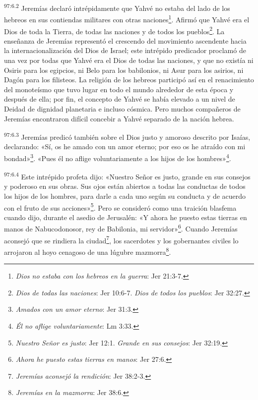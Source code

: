 \par
\textsuperscript{97:6.2} Jeremías declaró intrépidamente que Yahvé no estaba del lado de los hebreos en sus contiendas militares con otras naciones\footnote{\textit{Dios no estaba con los hebreos en la guerra}: Jer 21:3-7.}. Afirmó que Yahvé era el Dios de toda la Tierra, de todas las naciones y de todos los pueblos\footnote{\textit{Dios de todas las naciones}: Jer 10:6-7. \textit{Dios de todos los pueblos}: Jer 32:27.}. La enseñanza de Jeremías representó el crescendo del movimiento ascendente hacia la internacionalización del Dios de Israel; este intrépido predicador proclamó de una vez por todas que Yahvé era el Dios de todas las naciones, y que no existía ni Osiris para los egipcios, ni Belo para los babilonios, ni Asur para los asirios, ni Dagón para los filisteos. La religión de los hebreos participó así en el renacimiento del monoteísmo que tuvo lugar en todo el mundo alrededor de esta época y después de ella; por fin, el concepto de Yahvé se había elevado a un nivel de Deidad de dignidad planetaria e incluso cósmica. Pero muchos compañeros de Jeremías encontraron difícil concebir a Yahvé separado de la nación hebrea.

\par
\textsuperscript{97:6.3} Jeremías predicó también sobre el Dios justo y amoroso descrito por Isaías, declarando: «Sí, os he amado con un amor eterno; por eso os he atraído con mi bondad»\footnote{\textit{Amados con un amor eterno}: Jer 31:3.}. «Pues él no aflige voluntariamente a los hijos de los hombres»\footnote{\textit{Él no aflige voluntariamente}: Lm 3:33.}.

\par
\textsuperscript{97:6.4} Este intrépido profeta dijo: «Nuestro Señor es justo, grande en sus consejos y poderoso en sus obras. Sus ojos están abiertos a todas las conductas de todos los hijos de los hombres, para darle a cada uno según su conducta y de acuerdo con el fruto de sus acciones»\footnote{\textit{Nuestro Señor es justo}: Jer 12:1. \textit{Grande en sus consejos}: Jer 32:19.}. Pero se consideró como una traición blasfema cuando dijo, durante el asedio de Jerusalén: «Y ahora he puesto estas tierras en manos de Nabucodonosor, rey de Babilonia, mi servidor»\footnote{\textit{Ahora he puesto estas tierras en manos}: Jer 27:6.}. Cuando Jeremías aconsejó que se rindiera la ciudad\footnote{\textit{Jeremías aconsejó la rendición}: Jer 38:2-3.}, los sacerdotes y los gobernantes civiles lo arrojaron al hoyo cenagoso de una lúgubre mazmorra\footnote{\textit{Jeremías en la mazmorra}: Jer 38:6.}.

